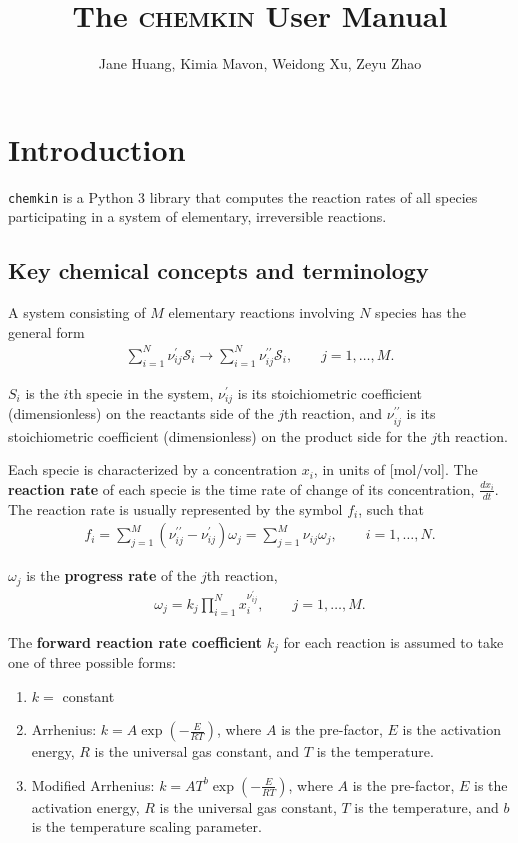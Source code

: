 \documentclass[12pt]{article}
\begin{document}
\title{The \textsc{chemkin} User Manual}
\author{Jane Huang, Kimia Mavon, Weidong Xu, Zeyu Zhao}
\date{}
\maketitle
\section{Introduction}


{\tt chemkin} is a Python 3 library that computes the reaction rates of all species participating in a system of elementary, irreversible reactions.

\subsection{Key chemical concepts and terminology}

A system consisting of $M$ elementary reactions involving $N$ species has the general form
\begin{align}
  \sum_{i=1}^{N}{\nu_{ij}^{\prime}\mathcal{S}_{i}} \longrightarrow
  \sum_{i=1}^{N}{\nu_{ij}^{\prime\prime}\mathcal{S}_{i}}, \qquad j = 1, \ldots, M.
\end{align}

$S_i$ is the $i$th specie in the system, $\nu_{ij}^{\prime}$ is its stoichiometric coefficient (dimensionless) on the reactants side of the $j$th reaction, and $\nu_{ij}^{\prime\prime}$ is its stoichiometric coefficient (dimensionless) on the product side for the $j$th reaction.

Each specie is characterized by a concentration $x_i$, in units of [mol/vol].
The \textbf{reaction rate} of each specie is the time rate of change of its concentration, $\frac{dx_i}{dt}$. The reaction rate is usually represented by the symbol $f_i$, such that
\begin{align}
  f_{i} = \sum_{j=1}^{M}{(\nu_{ij}^{\prime\prime}-\nu_{ij}^\prime)\omega_{j}}= \sum_{j=1}^{M}{\nu_{ij}\omega_{j}}, \qquad i = 1, \ldots, N.
\end{align}

$\omega_j$ is the \textbf{progress rate} of the $j$th reaction,
\begin{align}
  \omega_{j} = k_{j}\prod_{i=1}^{N}{x_{i}^{\nu_{ij}^{\prime}}}, \qquad j = 1, \ldots, M.
  \end{align}

The \textbf{forward reaction rate coefficient} $k_j$ for each reaction is assumed to take one of three possible forms:
\begin{enumerate}
\item $k=$ constant
\item Arrhenius: $k=A\exp(-\frac{E}{RT})$, where $A$ is the pre-factor, $E$ is the activation energy, $R$ is the universal gas constant, and $T$ is the temperature.
\item Modified Arrhenius: $k=AT^b\exp(-\frac{E}{RT})$, where $A$ is the pre-factor, $E$ is the activation energy, $R$ is the universal gas constant, $T$ is the temperature, and $b$ is the temperature scaling parameter.
\end{enumerate}
\end{document}

